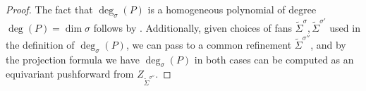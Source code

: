 \documentclass[12pt, oneside]{amsart}   	%
\newcommand{\gp}{\operatorname{gp}}
\numberwithin{equation}{section}
\numberwithin{thm}{section}
\numberwithin{figure}{section}
\begin{document}
\begin{proof}

The fact that $\deg_{\sigma}(P)$ is a homogeneous polynomial of degree $\deg(P) = \dim\sigma$ follows by \cite[Proposition $1.1$]{PPM}. Additionally, given choices of fans $\widetilde{\Sigma}^{\sigma},\widetilde{\Sigma}^{\sigma'}$ used in the definition of $\deg_{\sigma}(P)$, we can pass to a common refinement $\widetilde{\Sigma}^{\sigma''}$, and by the projection formula we have $\deg_{\sigma}(P)$ in both cases can be computed as an equivariant pushforward from $Z_{\widetilde{\Sigma}^{\sigma''}}$.






\end{proof}
\end{document}

